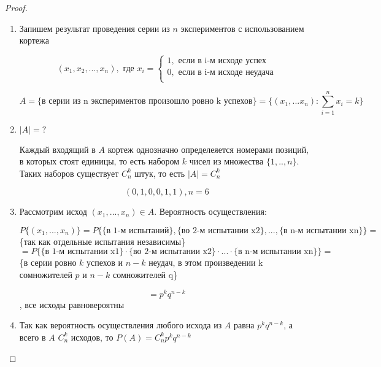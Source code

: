\documentclass[a4paper, 14pt]{report}
\begin{document}
\begin{proof}
    \hfill

    \begin{enumerate}
        \item Запишем результат проведения серии из $n$ экспериментов с использованием кортежа

            $$
            (x_1,x_2,...,x_n), \text{ где } x_i =
            \begin{cases}
                1, \text{ если в i-м исходе успех} \\
                0, \text{ если в i-м исходе неудача} \\
            \end{cases}
            $$

            $$
            A = \{ \text{в серии из n экспериментов произошло ровно k успехов} \} = \{ (x_1,... x_n) : \sum_{i=1}^n x_i = k \}
            $$

        \item $|A| = ?$

            Каждый входящий в $A$ кортеж однозначно определеяется номерами позиций, в которых стоят единицы, то есть набором $k$ чисел из множества $\{ 1,.., n\}$. Таких наборов существует $C_n^k$ штук, то есть $|A| = C_n^k$

            $$
            (0,1,0,0,1,1), n = 6
            $$

        \item  Рассмотрим исход $(x_1, ..., x_n) \in A$. Вероятность осуществления:

            $$
            P\{(x_1,...,x_n)\} =P\{\{\text{в 1-м испытаний}\},  \{ \text{во 2-м испытании x2} \},...,\{\text{в n-м испытании xn}\}\} = 
            $$
            \{так как отдельные испытания независимы\}
            $$
            = P \{ \{ \text{в 1-м испытании x1} \} \cdot \{ \text{во 2-м испытании x2} \} \cdot ... \cdot \{ \text{в n-м испытании xn} \} \} =
            $$
            \{в серии ровно $k$ успехов и $n-k$ неудач, в этом произведении k сомножителей $p$ и $n-k$ сомножителей q\}
            
            $$
            = p^kq^{n-k}
            $$, все исходы равновероятны

        \item Так как вероятность осуществления любого исхода из $A$ равна $p^k q^{n-k}$, а всего в $A$ $C_n^k$ исходов, то $P(A) = C_n^k p^k q^{n-k}$
    \end{enumerate}
\end{proof}
\end{document}
